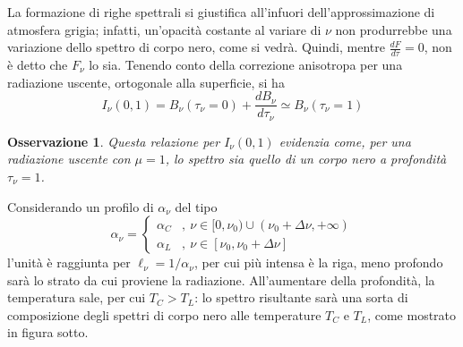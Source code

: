 \documentclass[11pt, a4paper]{scrartcl}
\theoremstyle{style}
\newtheorem{osservazione}{Osservazione}[section]
\theoremstyle{style1}
\numberwithin{equation}{subsection}
\begin{document}
La formazione di righe spettrali si giustifica all'infuori dell'approssimazione di atmosfera grigia; infatti, un'opacit\`a costante al variare di $\nu $ non produrrebbe una variazione dello spettro di corpo nero, come si vedr\`a.
Quindi, mentre $\frac{d F}{d \tau }  = 0$, non \`e detto che $F_\nu $ lo sia.
Tenendo conto della correzione anisotropa per una radiazione uscente, ortogonale alla superficie, si ha
\[
I_\nu (0,1) = B_\nu (\tau _\nu = 0 ) + \frac{d B_\nu }{d \tau _\nu } \simeq B_\nu (\tau _\nu =1)
\] 
\begin{osservazione}
Questa relazione per $I_\nu (0,1)$ evidenzia come, per una radiazione uscente con $\mu = 1$, lo spettro sia quello di un corpo nero a profondit\`a $\tau _\nu  = 1$.
\end{osservazione}
\noindent Considerando un profilo di $\alpha _\nu$ del tipo
\[
\alpha _\nu  = \begin{cases}
	\alpha _C &,\ \nu \in [0,\nu _0)\cup ( \nu _0+\Delta \nu , +\infty  ) \\
	\alpha _L &,\ \nu \in [\nu _0 , \nu _0 +\Delta \nu ]
\end{cases}
\] 
l'unit\`a \`e raggiunta per $\ell _\nu = 1 / \alpha _\nu $, per cui pi\`u intensa \`e la riga, meno profondo sar\`a lo strato da cui proviene la radiazione.
All'aumentare della profondit\`a, la temperatura sale, per cui $T_C > T_L$: lo spettro risultante sar\`a una sorta di composizione degli spettri di corpo nero alle temperature $T_C$ e $T_L$, come mostrato in figura sotto. 
\end{document}

